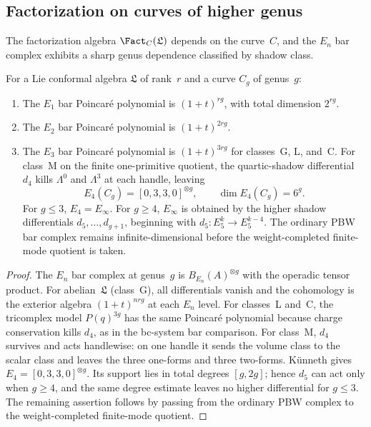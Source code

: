 \subsection{Factorization on curves of higher genus}
\label{subsec:envelope-higher-genus}

The factorization algebra $\Fact_C(\mathfrak{L})$ depends on the curve~$C$, and the $E_n$ bar complex exhibits a sharp genus dependence classified by shadow class.

\begin{proposition}
\label{prop:en-bar-genus}
For a Lie conformal algebra $\mathfrak{L}$ of rank~$r$ and a curve $C_g$ of genus~$g$:
\begin{enumerate}[label=\textup{(\roman*)}]
 \item The $E_1$ bar Poincar\'e polynomial is $(1+t)^{rg}$, with total dimension $2^{rg}$.
 \item The $E_2$ bar Poincar\'e polynomial is $(1+t)^{2rg}$.
 \item The $E_3$ bar Poincar\'e polynomial is $(1+t)^{3rg}$ for classes~G, L, and~C. For class~M on the finite one-primitive quotient, the quartic-shadow differential \(d_4\) kills \(\Lambda^0\) and \(\Lambda^3\) at each handle, leaving
 \[
 E_4(C_g)=[0,3,3,0]^{\otimes g},
 \qquad
 \dim E_4(C_g)=6^g .
 \]
 For \(g\leq3\), \(E_4=E_\infty\). For \(g\geq4\), \(E_\infty\) is obtained by the higher shadow differentials \(d_5,\ldots,d_{g+1}\), beginning with \(d_5:E_5^k\to E_5^{k-4}\). The ordinary PBW bar complex remains infinite-dimensional before the weight-completed finite-mode quotient is taken.
\end{enumerate}
\end{proposition}

\begin{proof}
The $E_n$ bar complex at genus~$g$ is \(B_{E_n}(A)^{\otimes g}\) with the operadic tensor product. For abelian~\(\mathfrak L\) (class~G), all differentials vanish and the cohomology is the exterior algebra \((1+t)^{nrg}\) at each \(E_n\) level. For classes~L and~C, the tricomplex model \(P(q)^{3g}\) has the same Poincar\'e polynomial because charge conservation kills \(d_4\), as in the bc-system bar comparison. For class~M, \(d_4\) survives and acts handlewise: on one handle it sends the volume class to the scalar class and leaves the three one-forms and three two-forms. K\"unneth gives \(E_4=[0,3,3,0]^{\otimes g}\). Its support lies in total degrees \([g,2g]\); hence \(d_5\) can act only when \(g\geq4\), and the same degree estimate leaves no higher differential for \(g\leq3\). The remaining assertion follows by passing from the ordinary PBW complex to the weight-completed finite-mode quotient.
\end{proof}


